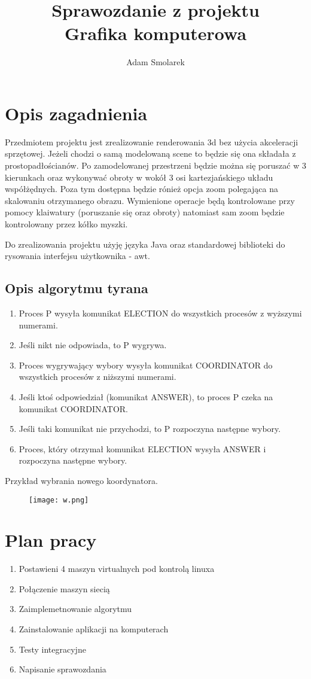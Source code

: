 \documentclass{article}
\begin{document}
\title{Sprawozdanie z projektu\\ Grafika komputerowa}
\author{Adam Smolarek}

\maketitle

\section{Opis zagadnienia}
Przedmiotem projektu jest zrealizowanie renderowania 3d bez użycia akceleracji sprzętowej. Jeżeli chodzi o samą modelowaną scene to będzie się ona składała z prostopadłościanów. Po zamodelowanej przestrzeni będzie można się poruszać w 3 kierunkach oraz wykonywać obroty w wokół 3 osi kartezjańskiego układu współżędnych. Poza tym dostępna będzie rónież opcja zoom polegająca na skalowaniu otrzymanego obrazu. Wymienione operacje będą kontrolowane przy pomocy klaiwatury (poruszanie się oraz obroty) natomiast sam zoom będzie kontrolowany przez kółko myszki. 

Do zrealizowania projektu użyję języka Java oraz standardowej biblioteki do rysowania interfejsu użytkownika - awt. 
\subsection{Opis algorytmu tyrana}
\begin{enumerate}
\item Proces P wysyła komunikat ELECTION do wszystkich procesów z wyższymi numerami.
\item Jeśli nikt nie odpowiada, to P wygrywa.
\item Proces wygrywający wybory wysyła komunikat COORDINATOR do wszystkich procesów z niższymi numerami.
\item Jeśli ktoś odpowiedział (komunikat ANSWER), to proces P czeka na komunikat COORDINATOR.
\item Jeśli taki komunikat nie przychodzi, to P rozpoczyna następne wybory.
\item Proces, który otrzymał komunikat ELECTION wysyła ANSWER i rozpoczyna następne wybory.
\end{enumerate}

\newpage
Przykład wybrania nowego koordynatora.

\begin{figure}
    \texttt{[image: w.png]}
\end{figure}

\section{Plan pracy}
\begin{enumerate}
\item Postawieni 4 maszyn virtualnych pod kontrolą linuxa
\item Połączenie maszyn siecią
\item Zaimplemetnowanie algorytmu
\item Zainstalowanie aplikacji na komputerach
\item Testy integracyjne
\item Napisanie sprawozdania
\end{enumerate}
\end{document}
